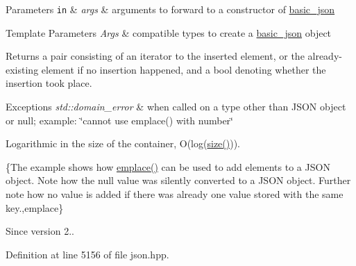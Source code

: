 \begin{DoxyParams}[1]{Parameters}
\mbox{\tt in}  & {\em args} & arguments to forward to a constructor of \hyperlink{classnlohmann_1_1basic__json}{basic\+\_\+json} \\
\hline
\end{DoxyParams}

\begin{DoxyTemplParams}{Template Parameters}
{\em Args} & compatible types to create a \hyperlink{classnlohmann_1_1basic__json}{basic\+\_\+json} object\\
\hline
\end{DoxyTemplParams}
\begin{DoxyReturn}{Returns}
a pair consisting of an iterator to the inserted element, or the already-\/existing element if no insertion happened, and a bool denoting whether the insertion took place.
\end{DoxyReturn}

\begin{DoxyExceptions}{Exceptions}
{\em std\+::domain\+\_\+error} & when called on a type other than J\+S\+O\+N object or null; example\+: {\ttfamily \char`\"{}cannot use emplace() with number\char`\"{}}\\
\hline
\end{DoxyExceptions}
Logarithmic in the size of the container, O(log({\ttfamily \hyperlink{classnlohmann_1_1basic__json_a01833b332b68d9af1f7cd7a816c39e49}{size()}})).

\{The example shows how {\ttfamily \hyperlink{classnlohmann_1_1basic__json_a6aad9abff425c8c49daa46f8de67965f}{emplace()}} can be used to add elements to a J\+S\+O\+N object. Note how the {\ttfamily null} value was silently converted to a J\+S\+O\+N object. Further note how no value is added if there was already one value stored with the same key.,emplace\}

\begin{DoxySince}{Since}
version 2.. 
\end{DoxySince}


Definition at line 5156 of file json.\+hpp.

\hypertarget{classnlohmann_1_1basic__json_a7f7bbb3a9efef2e2442f538a24c1c47b}{}
